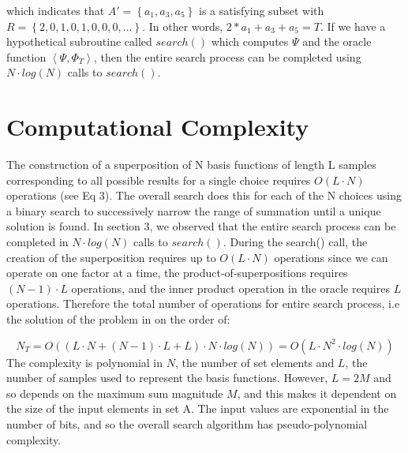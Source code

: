 \documentclass[reqno]{amsart}
\theoremstyle{definition}
\theoremstyle{remark}
\begin{document}
\noindent
which indicates that $A'= \left\{a_1, a_3, a_5 \right\}$ is a satisfying subset with $R = \left\{2,0,1,0,1,0,0,0,...\right\}$. 
In other words, $2*a_1 + a_3 + a_5 = T $. If we have a hypothetical subroutine called $search()$ which computes $\Psi$ and the oracle function
$\left \langle  \Psi, \Phi _T  \right \rangle $, then the entire search process can be completed using $N\cdot log(N)$ calls to $search()$.




\section{Computational Complexity}
The construction of a superposition of N basis functions of length L samples corresponding to all possible results for a single choice requires $O(L\cdot N)$ operations (see Eq 3).  The overall search does this for each of the N choices using a binary search to successively narrow the range of summation until a unique solution is found. In section 3, we observed that the entire search process can be completed in $N\cdot log(N)$ calls to $search()$. During the search() call, the creation of the superposition requires up to $O(L\cdot N)$ operations since we can operate on one factor at a time, the product-of-superpositions requires $(N-1)\cdot L$ operations, and the inner product operation in the oracle requires $L$ operations. Therefore the total number of operations for entire search process, i.e the solution of the problem in on the order of:

\begin{equation}
N_T = O( (L \cdot N + (N-1)\cdot L + L) \cdot N\cdot log(N) ) = O( L\cdot N^2 \cdot  log(N))
\end{equation}
\noindent
The complexity is polynomial in $N$, the number of set elements and $L$, the number of samples used to represent the basis functions. However, $L = 2M$ and so depends on the maximum sum magnitude $M$, and this makes it dependent on the size of the input elements in set A. The input values are exponential in the number of bits, and so the overall search algorithm has pseudo-polynomial complexity.


\newpage
\end{document}
